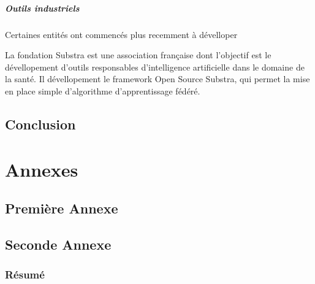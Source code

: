\documentclass[stage3a]{tnreport} %
\begin{document}
\subsubsection{Outils industriels}

Certaines entités ont commencés plus recemment à dévelloper 

La fondation Substra est une association française dont l'objectif est le dévellopement d'outils responsables d'intelligence artificielle dans le domaine de la santé. Il dévellopement le framework Open Source Substra, qui permet la mise en place simple d'algorithme d'apprentissage fédéré. 




\cleardoublepage


\chapter{Conclusion}

\cleardoublepage

\renewcommand{\tocbibname}{Bibliographie / Webographie}


\cleardoublepage


\listoffigures
\cleardoublepage

\listoftables
\cleardoublepage

\lstlistoflistings
\cleardoublepage

\printglossaries

\cleardoublepage
\renewcommand{\thesubsection}{\Roman{subsection}}

\appendix
\part*{Annexes}
\cleardoublepage

\chapter{Première Annexe}
\cleardoublepage

\chapter{Seconde Annexe}


\cleardoublepage
\thispagestyle{empty}

\section*{Résumé}
\end{document}
